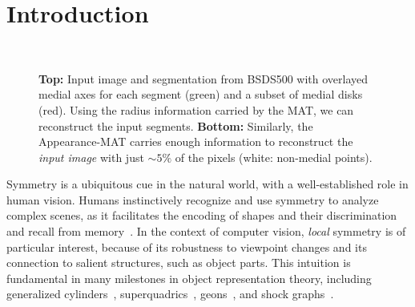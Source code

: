\documentclass[10pt,twocolumn,letterpaper]{article}
\begin{document}
\section{Introduction}\label{sec:introduction}
\begin{figure}[!t]
\centering
{}
 \\
\caption{\textbf{Top:} Input image and segmentation from BSDS500 with overlayed medial axes for each segment (green)
 and a subset of medial disks (red). Using the radius information carried by the MAT, we can reconstruct the
 input segments. \textbf{Bottom:} Similarly, the Appearance-MAT carries enough information to reconstruct the 
 \emph{input image} with just $\sim 5\%$ of the pixels (white: non-medial points).}
\label{fig:teaser}
\end{figure}


Symmetry is a ubiquitous cue in the natural world, with a well-established role in human vision.
Humans instinctively recognize and use symmetry to analyze complex scenes, as it facilitates the encoding of shapes and
their discrimination and recall from memory~\cite{barlow1979versatility,royer1981detection,wagemans1998parallel}.
In the context of computer vision, \emph{local} symmetry is of particular interest, 
because of its robustness to viewpoint changes and its connection to salient structures, such as object parts.
This intuition is fundamental in many milestones in object representation theory, including generalized
cylinders~\cite{binford1971visual}, superquadrics~\cite{barr1981superquadrics}, 
geons~\cite{biederman1987recognition}, and shock graphs~\cite{siddiqi1999shock}.
\end{document}
